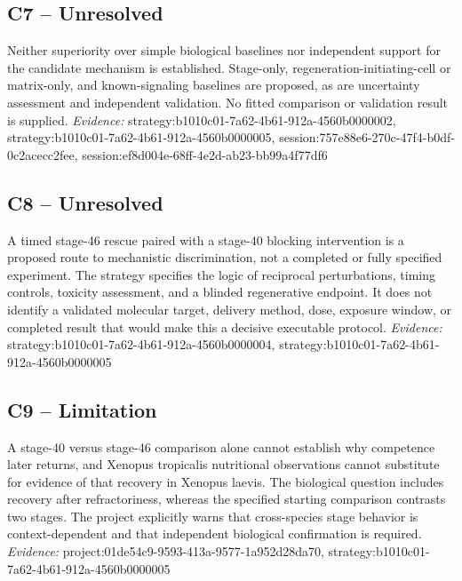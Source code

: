 \documentclass[11pt]{article}
\begin{document}
\subsection{C7 -- Unresolved}
Neither superiority over simple biological baselines nor independent support for the candidate mechanism is established.
Stage-only, regeneration-initiating-cell or matrix-only, and known-signaling baselines are proposed, as are uncertainty assessment and independent validation. No fitted comparison or validation result is supplied.
\textit{Evidence: }strategy:b1010c01-7a62-4b61-912a-4560b0000002, strategy:b1010c01-7a62-4b61-912a-4560b0000005, session:757e88e6-270c-47f4-b0df-0c2acecc2fee, session:ef8d004e-68ff-4e2d-ab23-bb99a4f77df6
\subsection{C8 -- Unresolved}
A timed stage-46 rescue paired with a stage-40 blocking intervention is a proposed route to mechanistic discrimination, not a completed or fully specified experiment.
The strategy specifies the logic of reciprocal perturbations, timing controls, toxicity assessment, and a blinded regenerative endpoint. It does not identify a validated molecular target, delivery method, dose, exposure window, or completed result that would make this a decisive executable protocol.
\textit{Evidence: }strategy:b1010c01-7a62-4b61-912a-4560b0000004, strategy:b1010c01-7a62-4b61-912a-4560b0000005
\subsection{C9 -- Limitation}
A stage-40 versus stage-46 comparison alone cannot establish why competence later returns, and Xenopus tropicalis nutritional observations cannot substitute for evidence of that recovery in Xenopus laevis.
The biological question includes recovery after refractoriness, whereas the specified starting comparison contrasts two stages. The project explicitly warns that cross-species stage behavior is context-dependent and that independent biological confirmation is required.
\textit{Evidence: }project:01de54c9-9593-413a-9577-1a952d28da70, strategy:b1010c01-7a62-4b61-912a-4560b0000005
\end{document}
